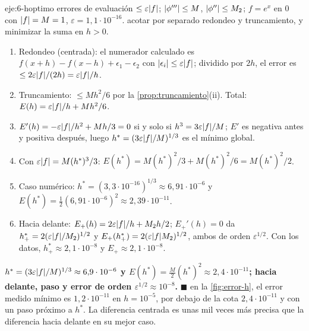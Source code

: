 \begin{solucion}{eje:6-hoptimo}
\datos errores de evaluación $\le\varepsilon\lvert f\rvert$; $\lvert\phi'''\rvert\le M$, $\lvert\phi''\rvert\le M_2$; $f=e^{x}$ en $0$ con $\lvert f\rvert=M=1$, $\varepsilon=1{,}1\cdot 10^{-16}$.
\planteamiento acotar por separado redondeo y truncamiento, y minimizar la suma en $h>0$.
\pasos
\begin{enumerate}[label=\arabic*.]
  \item Redondeo (centrada): el numerador calculado es $f(x+h)-f(x-h)+\epsilon_1-\epsilon_2$ con $\lvert\epsilon_i\rvert\le\varepsilon\lvert f\rvert$; dividido por $2h$, el error es $\le 2\varepsilon\lvert f\rvert/(2h)=\varepsilon\lvert f\rvert/h$.
  \item Truncamiento: $\le Mh^{2}/6$ por la \cref{prop:truncamiento}(ii). Total: $E(h)=\varepsilon\lvert f\rvert/h+Mh^{2}/6$.
  \item $E'(h)=-\varepsilon\lvert f\rvert/h^{2}+Mh/3=0$ si y solo si $h^{3}=3\varepsilon\lvert f\rvert/M$; $E'$ es negativa antes y positiva después, luego $h^{*}=(3\varepsilon\lvert f\rvert/M)^{1/3}$ es el mínimo global.
  \item Con $\varepsilon\lvert f\rvert=M(h^{*})^{3}/3$: $E(h^{*})=M(h^{*})^{2}/3+M(h^{*})^{2}/6=M(h^{*})^{2}/2$.
  \item Caso numérico: $h^{*}=(3{,}3\cdot 10^{-16})^{1/3}\approx 6{,}91\cdot 10^{-6}$ y $E(h^{*})=\tfrac12(6{,}91\cdot 10^{-6})^{2}\approx 2{,}39\cdot 10^{-11}$.
  \item Hacia delante: $E_+(h)=2\varepsilon\lvert f\rvert/h+M_2h/2$; $E_+'(h)=0$ da $h_+^{*}=2(\varepsilon\lvert f\rvert/M_2)^{1/2}$ y $E_+(h_+^{*})=2(\varepsilon\lvert f\rvert M_2)^{1/2}$, ambos de orden $\varepsilon^{1/2}$. Con los datos, $h_+^{*}\approx 2{,}1\cdot 10^{-8}$ y $E_+\approx 2{,}1\cdot 10^{-8}$.
\end{enumerate}
\resultado \textbf{$h^{*}=(3\varepsilon\lvert f\rvert/M)^{1/3}\approx 6{,}9\cdot 10^{-6}$ y $E(h^{*})=\tfrac M2(h^{*})^{2}\approx 2{,}4\cdot 10^{-11}$; hacia delante, paso y error de orden $\varepsilon^{1/2}\approx 10^{-8}$.} $\blacksquare$
\comprobacion en la \cref{fig:error-h}, el error medido mínimo es $1{,}2\cdot 10^{-11}$ en $h=10^{-5}$, por debajo de la cota $2{,}4\cdot 10^{-11}$ y con un paso próximo a $h^{*}$. La diferencia centrada es unas mil veces más precisa que la diferencia hacia delante en su mejor caso.
\end{solucion}
